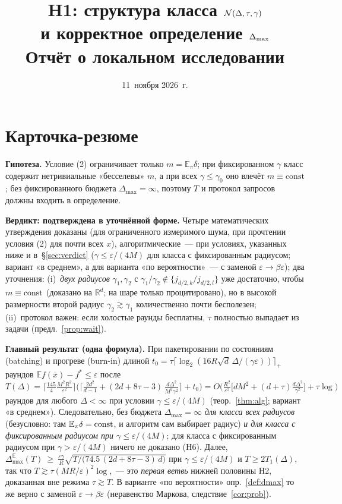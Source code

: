 \documentclass[11pt,a4paper]{article}
\title{\textbf{H1: структура класса $\mathcal N(\Delta,\tau,\gamma)$\\ и корректное определение $\Dmax$}\\[2pt]
\large Отчёт о локальном исследовании}
\author{}
\date{11~ноября 2026~г.}
\numberwithin{equation}{section}
\theoremstyle{definition}
\theoremstyle{remark}
\newcommand{\E}{\mathbb E}\newcommand{\R}{\mathbb R}\newcommand{\N}{\mathbb N}\let\Prob\relax\newcommand{\Prob}{\mathbb P}
\newcommand{\Dmax}{\Delta_{\max}}\newcommand{\Dcp}{\Delta_{\rm cp}}
\begin{document}
\maketitle

\tableofcontents

\setcounter{section}{-1}
\section{Карточка-резюме}\label{sec:card}
\begin{tcolorbox}[card,title={H1 на одной странице}]
\textbf{Гипотеза.} Условие (2) ограничивает только $m=\E_\pi\delta$; при фиксированном $\gamma$ класс содержит нетривиальные «бесселевы» $m$,
а при всех $\gamma\le\gamma_0$ оно влечёт $m\equiv\mathrm{const}$; без фиксированного бюджета $\Dmax=\infty$, поэтому $T$ и протокол запросов должны входить в определение.

\textbf{Вердикт: подтверждена в уточнённой форме.} Четыре математических утверждения доказаны (для ограниченного измеримого шума, при прочтении условия (2)
для почти всех $x$), алгоритмические~--- при условиях, указанных ниже и в~\S\ref{sec:verdict} ($\gamma\le\varepsilon/(4M)$ для класса с фиксированным радиусом; вариант «в среднем», а для варианта «по вероятности»~--- с заменой $\varepsilon\to\beta\varepsilon$); два уточнения: (i)~\emph{двух радиусов} $\gamma_1,\gamma_2$ с $\gamma_1/\gamma_2\notin\{j_{d/2,k}/j_{d/2,l}\}$ уже достаточно, чтобы $m\equiv{\rm const}$ (доказано на $\R^d$; на шаре только процитировано), но в высокой размерности второй радиус $\gamma_2\gtrsim\gamma_1$ количественно почти бесполезен;
(ii)~протокол важен: если холостые раунды бесплатны, $\tau$ полностью выпадает из задачи (предл.~\ref{prop:wait}).

\textbf{Главный результат (одна формула).} При пакетировании по состояниям (batching) и прогреве (burn-in) длиной $t_0=\tau\lceil\log_2(16R\sqrt d\,\Delta/(\gamma\varepsilon))\rceil_+$ раундов $\E f(\bar x)-f^*\le\varepsilon$ после
\[
T(\Delta)=\Big\lceil\tfrac{145}{4}\tfrac{M^2R^2}{\varepsilon^2}\Big\rceil\Big(\Big\lceil \tfrac{2d^2}{d-1}+(2d+8\tau-3)\,\tfrac{d\Delta^2}{M^2\gamma^2}\Big\rceil+t_0\Big)
=O\!\Big(\tfrac{R^2}{\varepsilon^2}\big[dM^2+(d+\tau)\tfrac{d\Delta^2}{\gamma^2}\big]+\tau\log\Big)
\]
раундов для любого $\Delta<\infty$ при условии $\gamma\le\varepsilon/(4M)$ (теор.~\ref{thm:alg}; вариант «в среднем»). Следовательно, без бюджета $\Dmax=\infty$ \emph{для класса всех радиусов} (безусловно: там $\E_\pi\delta={\rm const}$, и алгоритм сам выбирает радиус) \emph{и для класса с фиксированным радиусом при $\gamma\le\varepsilon/(4M)$}; для класса с фиксированным радиусом при $\gamma>\varepsilon/(4M)$ ничего не доказано (H6). Далее,
$\Dmax^{\E}(T)\ \ge\ \frac{\varepsilon\gamma}{R}\sqrt{T/\big(74.5\,(2d+8\tau-3)\,d\big)}$ при $\gamma\le\varepsilon/(4M)$ и $T\ge 2T_1(\Delta)$, так что $T\gtrsim\tau(MR/\varepsilon)^2\log$,~--- это \emph{первая ветвь} нижней половины H2, доказанная вне режима $\tau\gtrsim T$. В варианте «по вероятности» опр.~\ref{def:dmax} то же верно с заменой $\varepsilon\to\beta\varepsilon$ (неравенство Маркова, следствие~\ref{cor:prob}).


\end{tcolorbox}
\end{document}
